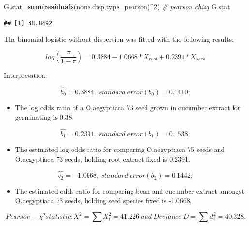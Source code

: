 \documentclass[
]{article}
\newenvironment{Shaded}{\begin{snugshade}}{\end{snugshade}}
\newcommand{\AttributeTok}[1]{\textcolor[rgb]{0.13,0.29,0.53}{#1}}
\newcommand{\CommentTok}[1]{\textcolor[rgb]{0.56,0.35,0.01}{\textit{#1}}}
\newcommand{\DecValTok}[1]{\textcolor[rgb]{0.00,0.00,0.81}{#1}}
\newcommand{\FunctionTok}[1]{\textcolor[rgb]{0.13,0.29,0.53}{\textbf{#1}}}
\newcommand{\NormalTok}[1]{#1}
\newcommand{\OtherTok}[1]{\textcolor[rgb]{0.56,0.35,0.01}{#1}}
\newcommand{\SpecialCharTok}[1]{\textcolor[rgb]{0.81,0.36,0.00}{\textbf{#1}}}
\newcommand{\StringTok}[1]{\textcolor[rgb]{0.31,0.60,0.02}{#1}}
\providecommand{\tightlist}{%
  \setlength{\itemsep}{0pt}\setlength{\parskip}{0pt}}
\begin{document}
\begin{Shaded}
\begin{Highlighting}[]
\NormalTok{G.stat}\OtherTok{=}\FunctionTok{sum}\NormalTok{(}\FunctionTok{residuals}\NormalTok{(none.disp,}\AttributeTok{type=}\StringTok{\textquotesingle{}pearson\textquotesingle{}}\NormalTok{)}\SpecialCharTok{\^{}}\DecValTok{2}\NormalTok{) }\CommentTok{\# pearson chisq }
\NormalTok{G.stat}
\end{Highlighting}
\end{Shaded}

\begin{verbatim}
## [1] 38.8492
\end{verbatim}

The binomial logistic without dispersion was fitted with the following
results:

\[log(\frac{\pi}{1-\pi}) = 0.3884 - 1.0668*X_{root}+0.2391*X_{seed}\]

Interpretation:

\[\hat{b_0} = 0.3884,\ standard \ error(b_0) = 0.1410;\]

\begin{itemize}
\tightlist
\item
  The log odds ratio of a O.aegyptiaca 73 seed grown in cucumber extract
  for germinating is 0.38.
\end{itemize}

\[\hat{b_1} = 0.2391,\ standard \ error(b_1) = 0.1538;\]

\begin{itemize}
\tightlist
\item
  The estimated log odds ratio for comparing O.aegyptiaca 75 seeds and
  O.aegyptiaca 73 seeds, holding root extract fixed is 0.2391.
\end{itemize}

\[\hat{b_2} = -1.0668,\ standard \ error(b_2) = 0.1442;\]

\begin{itemize}
\tightlist
\item
  The estimated odds ratio for comparing bean and cucumber extract
  amongst O.aegyptiaca 73 seeds, holding seed species fixed is -1.0668.
\end{itemize}

\[Pearson-\chi^2 statistic: X^2 = \sum X_i^2 = 41.226 \ and\ Deviance \ D = \sum d_i^2 = 40.328.\]

\begin{Shaded}
\end{Shaded}
\end{document}
